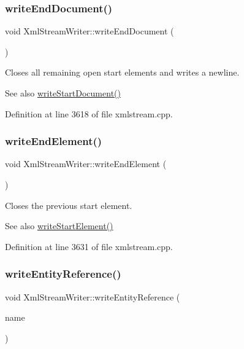 \subsubsection{\texorpdfstring{write\+End\+Document()}{writeEndDocument()}}
{\footnotesize\ttfamily void Xml\+Stream\+Writer\+::write\+End\+Document (\begin{DoxyParamCaption}{ }\end{DoxyParamCaption})}

Closes all remaining open start elements and writes a newline.

\begin{DoxySeeAlso}{See also}
\hyperlink{class_xml_stream_writer_ae9d5ccf2e94485352e4c1c8843dc0641}{write\+Start\+Document()} 
\end{DoxySeeAlso}


Definition at line 3618 of file xmlstream.\+cpp.

\mbox{\label{class_xml_stream_writer_add89e8f61a141e2b320cf2b567e7edfb}} 
\subsubsection{\texorpdfstring{write\+End\+Element()}{writeEndElement()}}
{\footnotesize\ttfamily void Xml\+Stream\+Writer\+::write\+End\+Element (\begin{DoxyParamCaption}{ }\end{DoxyParamCaption})}

Closes the previous start element.

\begin{DoxySeeAlso}{See also}
\hyperlink{class_xml_stream_writer_aa001c660c1df012b4e37773aa219c379}{write\+Start\+Element()} 
\end{DoxySeeAlso}


Definition at line 3631 of file xmlstream.\+cpp.

\mbox{\label{class_xml_stream_writer_aeea05577f7ecd0eaa34b4237fdbe446d}} 
\subsubsection{\texorpdfstring{write\+Entity\+Reference()}{writeEntityReference()}}
{\footnotesize\ttfamily void Xml\+Stream\+Writer\+::write\+Entity\+Reference (\begin{DoxyParamCaption}\item[{const Q\+String \&}]{name }\end{DoxyParamCaption})}

